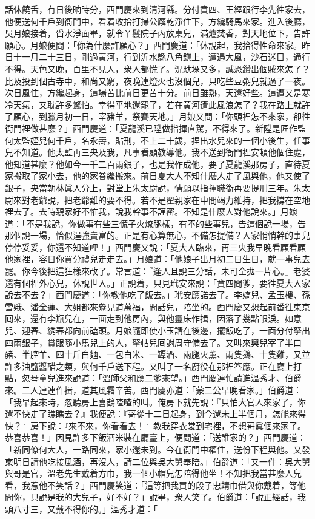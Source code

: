 話休饒舌，有日後晌時分，西門慶來到清河縣。分付賁四、王經跟行李先徃家去，他便送何千戶到衙門中，看着收拾打掃公廨乾淨住下，方纔騎馬來家。進入後廳，吳月娘接着，舀水淨面畢，就令丫鬟院子內放桌兒，滿爐焚香，對天地位下，告許願心。月娘便問：「你為什麼許願心？」西門慶道：「休說起，我拾得性命來家。昨日十一月二十三日，剛過黃河，行到沂水縣八角鎭上，遭遇大風，沙石迷目，通行不得。天色又晚，百里不見人，衆人都慌了。況馱垛又多，誠恐鑽出個賊來怎了？比及投到個古寺中，和尚又窮，夜晚連燈火也沒個兒，只吃些豆粥兒就過了一夜。次日風住，方纔起身，這場苦比前日更苦十分。前日雖熱，天還好些。這遭又是寒冷天氣，又耽許多驚怕。幸得平地還罷了，若在黃河遭此風浪怎了？我在路上就許了願心，{}到臘月初一日，宰豬羊，祭賽天地。」月娘又問：「你頭裡怎不來家，卻徃衙門裡做甚麼？」西門慶道：「夏龍溪已陞做指揮直駕，不得來了。新陞是匠作監何太監姪兒何千戶，名永壽，貼刑，不上二十歲，捏出水兒來的一個小後生，{}任事兒不知道。他太監再三央及我，凡事看顧教導他。我不送到衙門裡安頓他個住處，他知道甚麼？他如今一千二百兩銀子，也是我作成他，要了夏龍溪那房子，直待夏家搬取了家小去，他的家眷纔搬來。前日夏大人不知什麼人走了風與他，他又使了銀子，央當朝林眞人分上，對堂上朱太尉說，情願以指揮職銜再要提刑三年。朱太尉來對老爺說，把老爺難的要不得。若不是翟親家在中間竭力維持，把我撐在空地裡去了。去時親家好不恠我，說我幹事不謹密。不知是什麼人對他說來。」月娘道：「不是我說，你做事有些三慌子火燎腿樣，有不的些事兒，告這個說一場，告那個說一場，{}恰似逞強賣富的。正是有心算無心，不備怎提備？人家悄悄幹的事兒停停妥妥，你還不知道哩！」西門慶又說：「夏大人臨來，再三央我早晚看顧看顧他家裡，容日你買分禮兒走走去。」月娘道：「他娘子出月初二日生日，就一事兒去罷。你今後把這狂樣來改了。常言道：『逢人且說三分話，未可全拋一片心。』老婆還有個裡外心兒，{}休說世人。」{}正說着，只見玳安來說：「賁四問爹，要徃夏大人家說去不去？」西門慶道：「你教他吃了飯去。」玳安應諾去了。李嬌兒、孟玉樓、孫雪娥、潘金蓮、大姐都來叅見道萬福，問話兒，陪坐的。西門慶又想起前番徃東京囘來，還有李瓶兒在，一面走到他房內，與他靈床作揖，因落了幾點眼淚。如意兒、迎春、綉春都向前磕頭。月娘隨即使小玉請在後邊，擺飯吃了，一面分付拏出四兩銀子，賞跟隨小馬兒上的人，拏帖兒囘謝周守備去了。又叫來興兒宰了半口豬、半腔羊、四十斤白麵、一包白米、一罈酒、兩腿火薰、兩隻鵝、十隻雞，又並許多油鹽醬醋之類，與何千戶送下程。又叫了一名廚役在那裡答應。正在廳上打點，忽琴童兒進來說道：「溫師父和應二爹來望。」西門慶連忙請進溫秀才、伯爵來。二人連連作揖，道其風霜辛苦。西門慶亦道：「蒙二公早晚看家。」伯爵道：「我早起來時，忽聽房上喜鵲喳喳的叫。{}俺房下就先說：『只怕大官人來家了，你還不快走了瞧瞧去？』我便說：『哥從十二日起身，到今還未上半個月，怎能來得快？』房下說：『來不來，你看看去！』教我穿衣裳到宅裡，不想哥眞個來家了。恭喜恭喜！」因見許多下飯酒米裝在廳臺上，便問道：「送誰家的？」西門慶道：「新同僚何大人，一路同來，家小還未到。今在衙門中權住，送份下程與他。又發柬明日請他吃接風酒，再沒人，請二位與吳大舅奉陪。」伯爵道：「又一件：吳大舅與哥是官，溫老先生戴着方巾，我一個小帽兒怎陪得他坐！不知把我當甚麼人兒看，我惹他不笑話？」西門慶笑道：「這等把我買的段子忠靖巾借與你戴着，等他問你，只說是我的大兒子，好不好？」說畢，衆人笑了。伯爵道：「說正經話，我頭八寸三，又戴不得你的。」溫秀才道：「